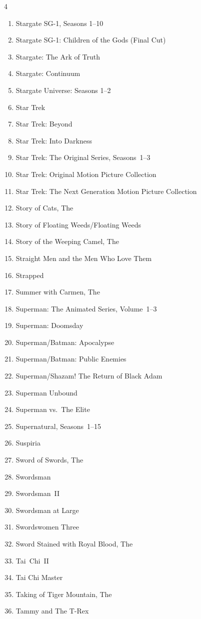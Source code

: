 \documentclass{article}
\begin{document}
\begin{multicols}{4}
\begin{enumerate}
\item Stargate SG-1, Seasons 1--10
\item Stargate SG-1: Children of the Gods (Final Cut)
\item Stargate: The Ark of Truth
\item Stargate: Continuum
\item Stargate Universe: Seasons 1--2
\item Star Trek
\item Star Trek: Beyond
\item Star Trek: Into Darkness
\item Star Trek: The Original Series, Seasons~1--3
\item Star Trek: Original Motion Picture Collection
\item Star Trek: The Next Generation Motion Picture Collection
\item Story of Cats, The
\item Story of Floating Weeds/Floating Weeds
\item Story of the Weeping Camel, The
\item Straight Men and the Men Who Love Them
\item Strapped
\item Summer with Carmen, The
\item Superman: The Animated Series, Volume~1--3
\item Superman: Doomsday
\item Superman/Batman: Apocalypse
\item Superman/Batman: Public Enemies
\item Superman/Shazam!  The Return of Black Adam
\item Superman Unbound
\item Superman vs.\ The Elite
\item Supernatural, Seasons~1--15
\item Suspiria
\item Sword of Swords, The
\item Swordsman
\item Swordsman~II
\item Swordsman at Large
\item Swordswomen Three
\item Sword Stained with Royal Blood, The
\item Tai~Chi~II
\item Tai Chi Master
\item Taking of Tiger Mountain, The
\item Tammy and The T-Rex

\end{enumerate}
\end{multicols}
\end{document}
